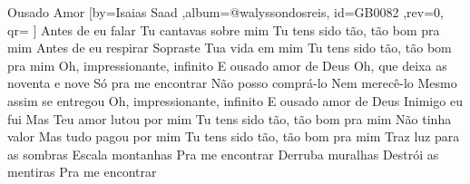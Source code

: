 \beginsong
{Ousado Amor %
}[by={Isaias Saad %
},album={@walyssondosreis},
id={GB0082 %
},rev={0}, %
qr={ %
}]
\beginverse*
Antes de eu falar
Tu cantavas sobre mim
Tu tens sido tão, tão bom pra mim
Antes de eu respirar
Sopraste Tua vida em mim
Tu tens sido tão, tão bom pra mim
\endverse
\beginchorus
Oh, impressionante, infinito
E ousado amor de Deus
Oh, que deixa as noventa e nove
Só pra me encontrar
Não posso comprá-lo
Nem merecê-lo
Mesmo assim se entregou
Oh, impressionante, infinito
E ousado amor de Deus
\endchorus
\beginverse*
Inimigo eu fui
Mas Teu amor lutou por mim
Tu tens sido tão, tão bom pra mim
Não tinha valor
Mas tudo pagou por mim
Tu tens sido tão, tão bom pra mim
\endverse
\beginverse*
Traz luz para as sombras
Escala montanhas
Pra me encontrar
Derruba muralhas
Destrói as mentiras
Pra me encontrar
\endverse

